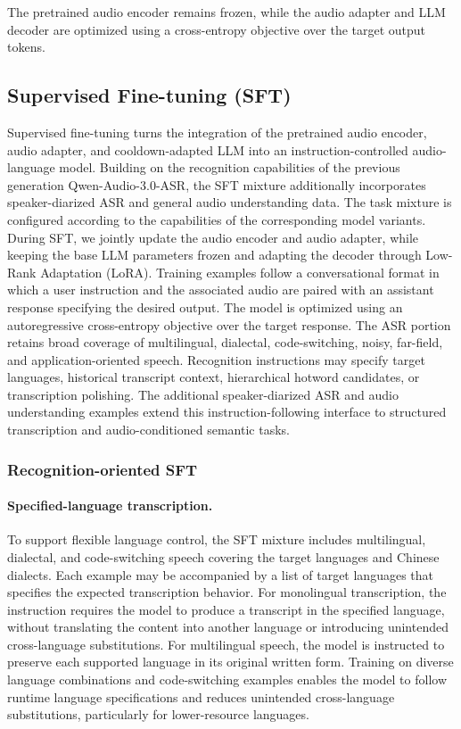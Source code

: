 \documentclass{article}
\begin{document}
The pretrained audio encoder remains frozen, while the audio adapter and LLM decoder are optimized using a cross-entropy objective over the target output tokens. 
%

\subsection{Supervised Fine-tuning (SFT)}
\label{subsec:SFT}

Supervised fine-tuning turns the integration of the pretrained audio encoder, audio adapter, and cooldown-adapted LLM into an instruction-controlled audio-language model. Building on the recognition capabilities of the previous generation Qwen-Audio-3.0-ASR, the SFT mixture additionally incorporates speaker-diarized ASR and general audio understanding data. The task mixture is configured according to the capabilities of the corresponding model variants.
During SFT, we jointly update the audio encoder and audio adapter, while keeping the base LLM parameters frozen and adapting the decoder through Low-Rank Adaptation (LoRA). Training examples follow a conversational format in which a user instruction and the associated audio are paired with an assistant response specifying the desired output. The model is optimized using an autoregressive cross-entropy objective over the target response.
The ASR portion retains broad coverage of multilingual, dialectal, code-switching, noisy, far-field, and application-oriented speech. Recognition instructions may specify target languages, historical transcript context, hierarchical hotword candidates, or transcription polishing. The additional speaker-diarized ASR and audio understanding examples extend this instruction-following interface to structured transcription and audio-conditioned semantic tasks.

\subsubsection{Recognition-oriented SFT}
\label{subsubsec:recognition-sft}

\paragraph{Specified-language transcription.}
To support flexible language control, the SFT mixture includes multilingual, dialectal, and code-switching speech covering the target languages and Chinese dialects. Each example may be accompanied by a list of target languages that specifies the expected transcription behavior. For monolingual transcription, the instruction requires the model to produce a transcript in the specified language, without translating the content into another language or introducing unintended cross-language substitutions. For multilingual speech, the model is instructed to preserve each supported language in its original written form. Training on diverse language combinations and code-switching examples enables the model to follow runtime language specifications and reduces unintended cross-language substitutions, particularly for lower-resource languages.
\end{document}
